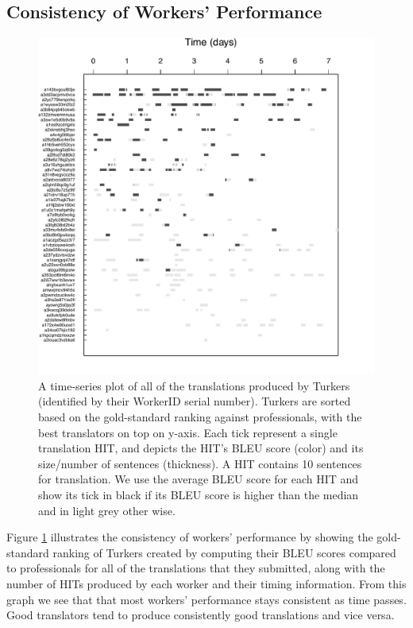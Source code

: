 \documentclass[11pt]{article}
\begin{document}
\subsection{Consistency of Workers' Performance}
\begin{figure}[h!]
  \centering
  \includegraphics[width=\linewidth]{WorkerPerf/wp.pdf}
  \caption{A time-series plot of all of the translations produced by Turkers (identified by their WorkerID serial number). Turkers are sorted based on the gold-standard ranking against professionals, with the best translators on top on y-axis. Each tick represent a single translation HIT, and depicts the HIT's BLEU score (color) and its size/number of sentences (thickness). A HIT contains 10 sentences for translation. We use the average BLEU score for each HIT and show its tick in black if   its BLEU score is higher than the median and in light grey other wise.
}
    \label{fworkerperf}
\end{figure}

Figure \ref{fworkerperf} illustrates the consistency of workers' performance by showing  the gold-standard ranking of Turkers created by computing their BLEU scores compared to professionals for all of the translations that they submitted, along with the number of HITs produced by each worker and their timing information.
From this graph we see that that most workers' performance stays
consistent as time passes.  Good translators tend to produce consistently good translations and vice versa. %
\end{document}
